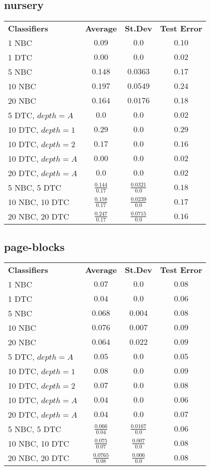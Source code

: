 \documentclass[12pt]{article}
\begin{document}
	\subsection{nursery}
		\begin{tabular}{lccc}
		\textbf{Classifiers} & \textbf{Average} & \textbf{St.Dev} & \textbf{Test Error}\\
			1 NBC & $0.09$ & $0.0$ & $0.10$\\
			1 DTC & $0.00$ & $0.0$ & $0.02$\\
			5 NBC & $0.148$ & $0.0363$ & $0.17$\\
			10 NBC & $0.197$ & $0.0549$ & $0.24$\\
			20 NBC & $0.164$ & $0.0176$ & $0.18$\\
			5 DTC, $depth = A$ & $0.0$ & $0.0$ & $0.02$ \\
			10 DTC, $depth = 1$ & $0.29$ & $0.0$ & $0.29$ \\
			10 DTC, $depth = 2$ & $0.17$ & $0.0$ & $0.16$ \\
			10 DTC, $depth = A$ & $0.00$ & $0.0$ & $0.02$ \\
			20 DTC, $depth = A$ & $0.0$ & $0.0$ & $0.02$ \\
			5 NBC, 5 DTC & $\frac{0.144}{0.17}$ & $\frac{0.0321}{0.0}$ & $0.18$ \\
			10 NBC, 10 DTC & $\frac{0.158}{0.17}$ & $\frac{0.0239}{0.0}$ & $0.17$ \\
			20 NBC, 20 DTC & $\frac{0.247}{0.17}$ & $\frac{0.0715}{0.0}$ & $0.16$ \\
		\end{tabular}
		
	\subsection{page-blocks}
		\begin{tabular}{lccc}
		\textbf{Classifiers} & \textbf{Average} & \textbf{St.Dev} & \textbf{Test Error}\\
			1 NBC & $0.07$ & $0.0$ & $0.08$\\
			1 DTC & $0.04$ & $0.0$ & $0.06$\\
			5 NBC & $0.068$ & $0.004$ & $0.08$\\
			10 NBC & $0.076$ & $0.007$ & $0.09$\\
			20 NBC & $0.064$ & $0.022$ & $0.09$\\
			5 DTC, $depth = A$ & $0.05$ & $0.0$ & $0.05$ \\
			10 DTC, $depth = 1$ & $0.08$ & $0.0$ & $0.09$ \\
			10 DTC, $depth = 2$ & $0.07$ & $0.0$ & $0.08$ \\
			10 DTC, $depth = A$ & $0.04$ & $0.0$ & $0.06$ \\
			20 DTC, $depth = A$ & $0.04$ & $0.0$ & $0.07$ \\
			5 NBC, 5 DTC & $\frac{0.066}{0.04}$ & $\frac{0.0167}{0.0}$ & $0.06$ \\
			10 NBC, 10 DTC & $\frac{0.075}{0.07}$ & $\frac{0.007}{0.0}$ & $0.08$ \\
			20 NBC, 20 DTC & $\frac{0.0765}{0.08}$ & $\frac{0.006}{0.0}$ & $0.08$ \\
		\end{tabular}
		
\end{document}

